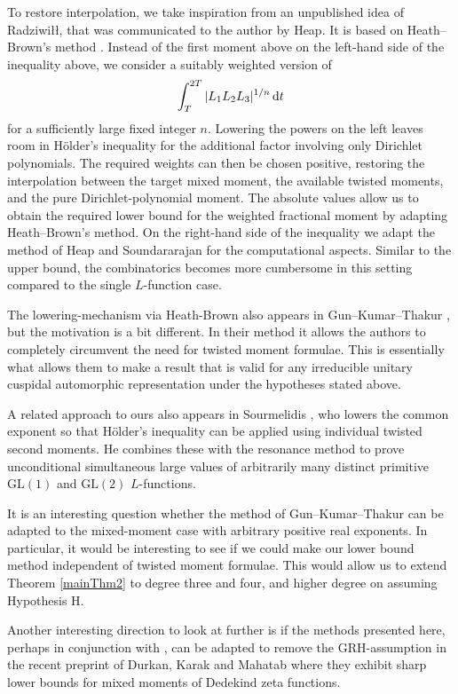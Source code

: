 \documentclass[oneside, 12pt]{amsart}
\theoremstyle{definition}
\newcommand{\dt}{\, \textup{d}t}
\begin{document}
	To restore interpolation, we take inspiration from an unpublished idea
	of Radziwi\l\l, that was communicated to the author by Heap. It is based on Heath--Brown's method \cite{Heath-Brown1}.
	Instead of the first moment above on the left-hand side of the inequality above, we consider a suitably weighted
	version of
	\[
	\int_T^{2T}|L_1L_2L_3|^{1/n}\dt
	\]
	for a sufficiently large fixed integer $n$. Lowering the powers on the
	left leaves room in H\"older's inequality for the additional factor
	involving only Dirichlet polynomials. The required weights can then be
	chosen positive, restoring the interpolation between the target mixed
	moment, the available twisted moments, and the pure Dirichlet-polynomial
	moment. The absolute values allow us to obtain the required lower bound
	for the weighted fractional moment by adapting Heath--Brown's method. On the right-hand side of the inequality we adapt the method of Heap and Soundararajan for the computational aspects. Similar to the upper bound, the combinatorics becomes more cumbersome in this setting compared to the single $L$-function case.
	
	The lowering-mechanism via Heath-Brown also appears in Gun--Kumar--Thakur \cite{GunKumarThakur}, but the motivation is a bit different. In their method it allows the authors to completely circumvent the need for twisted moment formulae. This is essentially what allows them to make a result that is valid for any irreducible unitary cuspidal automorphic representation under the hypotheses stated above. 
	
	A related approach to ours also appears in Sourmelidis \cite{Sourmelidis1},
	who lowers the common exponent so that Hölder's inequality
	can be applied using individual twisted second moments.
	He combines these with the
	resonance method to prove unconditional simultaneous large values
	of arbitrarily many distinct primitive $\mathrm{GL}(1)$ and
	$\mathrm{GL}(2)$ $L$-functions.
	
	It is an interesting question whether the method of Gun--Kumar--Thakur \cite{GunKumarThakur} can be adapted to the mixed-moment case with arbitrary
	positive real exponents. In particular, it would be interesting to see if we could make our lower bound method independent of twisted moment formulae. This would allow us to extend Theorem \ref{mainThm2} to degree three and four, and higher degree on assuming Hypothesis H.
	
	Another interesting direction to look at further is if the methods presented here, perhaps in conjunction with \cite{GunKumarThakur}, can be adapted to remove the GRH-assumption in the recent preprint of Durkan, Karak and Mahatab \cite{DurkanKarakMahatab} where they exhibit sharp lower bounds for mixed moments of Dedekind zeta functions.
	
\end{document}
